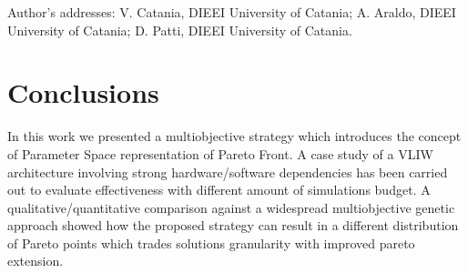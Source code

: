 \documentclass[prodmode,acmtecs]{acmsmall}
\begin{document}
\begin{bottomstuff}
Author's addresses: V. Catania, DIEEI University of Catania;
A. Araldo, DIEEI University of Catania;
D. Patti, DIEEI University of Catania.
\end{bottomstuff}

\maketitle





\section{Conclusions}
In this work we presented a multiobjective strategy which 
introduces the concept of Parameter Space representation of Pareto
Front. A case study of a VLIW architecture involving strong
hardware/software dependencies has been carried out to evaluate
effectiveness with different amount of simulations budget.
A qualitative/quantitative comparison against a widespread multiobjective genetic
approach showed how the proposed strategy can result in a different
distribution of Pareto points which trades solutions granularity with
improved pareto extension. 

\balance

 


\end{document}
